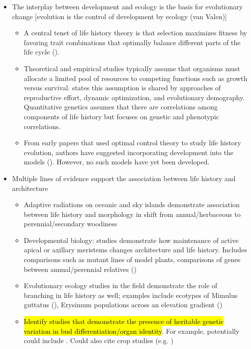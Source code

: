 \documentclass[12pt, oneside,titlepage]{article}   	%
\begin{document}
\singlespace
\begin{itemize}

\item The interplay between development and ecology is the basis for evolutionary change [evolution is the control of development by ecology (van Valen)]

\begin{itemize}
\item A central tenet of life history theory is that selection maximizes fitness by favoring trait combinations that optimally balance different parts of the life cycle (\cite{cole1954,lande1983}). 
\item Theoretical and empirical studies typically assume that organisms must allocate a limited pool of resources to competing functions such as growth versus survival. \cite{fox1990} states this assumption is shared by approaches of reproductive effort, dynamic optimization, and evolutionary demography. Quantitative genetics assumes that there are correlations among components of life history but focuses on genetic and phenotypic correlations.
\item From early papers that used optimal control theory to study life history evolution, authors have suggested incorporating development into the models (\cite{cohen1971,schaffer1982,fox1992a}). However, no such models have yet been developed. 
\end{itemize}

\item Multiple lines of evidence support the association between life history and architecture

\begin{itemize}
\item Adaptive radiations on oceanic and sky islands demonstrate association between life history and morphology in shift from annual/herbaceous to perennial/secondary woodiness \cite{nurk2019}
\item Developmental biology: studies demonstrate how maintenance of active apical or axillary meristems changes architecture and life history. Includes comparisons such as mutant lines of model plants, comparisons of genes between annual/perennial relatives (\cite{remington2015,ponraj2020})
\item Evolutionary ecology studies in the field demonstrate the role of branching in life history as well; examples include ecotypes of Mimulus guttatus (\cite{baker2011,baker2014,friedman2015a}), Erysimum populations across an elevation gradient (\cite{kim2011})
\item \hl{Identify studies that demonstrate the presence of heritable genetic variation in bud differentiation/organ identity}. For example, potentially could include \cite{bonser1996,bonser2003,doust2006,baker2012,huang2013,baker2014,rubin2018}. Could also cite crop studies (e.g. \cite{hardy1998})
\end{itemize}


\end{itemize}
\end{document}
